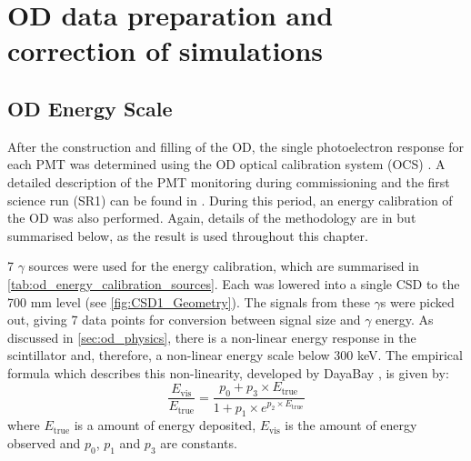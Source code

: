 \section{OD data preparation and correction of simulations}

\subsection{OD Energy Scale} \label{sec:od_energy_scale}
\par
After the construction and filling of the OD, the single photoelectron response for each PMT was determined using the OD optical calibration system (OCS) \cite{lz_ocs_system_ref}.
A detailed description of the PMT monitoring during commissioning and the first science run (SR1) can be found in \cite{ewanfraser_thesis_ref}. 
During this period, an energy calibration of the OD was also performed.
Again, details of the methodology are in \cite{ewanfraser_thesis_ref} but summarised below, as the result is used throughout this chapter.
\par
7 $\gamma$ sources were used for the energy calibration, which are summarised in \autoref{tab:od_energy_calibration_sources}.
Each was lowered into a single CSD to the 700 mm level (see \autoref{fig:CSD1_Geometry}).
The signals from these $\gamma$s were picked out, giving 7 data points for conversion between signal size and $\gamma$ energy.
As discussed in \autoref{sec:od_physics}, there is a non-linear energy response in the scintillator and, therefore, a non-linear energy scale below 300 keV.
The empirical formula which describes this non-linearity, developed by DayaBay \cite{dayabay_antineutrino_oscillation_ref, ls_nonlinear_energy_response_ref}, is given by:
\begin{equation}
    \frac{E_{\text{vis}}}{E_{\text{true}}} = \frac{p_0  + p_3 \times E_{\text{true}}}{1 + p_1 \times e^{p_2 \times E_{\text{true}}}}
    \label{eq:ls_light_response}
\end{equation}
where $E_{\text{true}}$ is a amount of energy deposited, $E_{\text{vis}}$ is the amount of energy observed and $p_0$, $p_1$ and $p_3$ are constants.

